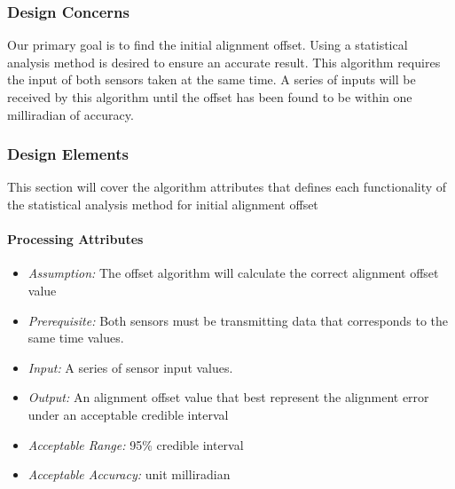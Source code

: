 		\subsubsection{Design Concerns}
		Our primary goal is to find the initial alignment offset. Using a statistical analysis method is desired to ensure an accurate result. This algorithm requires the input of both sensors taken at the same time. A series of inputs will be received by this algorithm until the offset has been found to be within one milliradian of accuracy.\\

		\subsubsection{Design Elements}
		This section will cover the algorithm attributes that defines each functionality of the statistical analysis method for initial alignment offset

			\paragraph{Processing Attributes}
			\begin{itemize}
				\item \textit{Assumption:} The offset algorithm will calculate the correct alignment offset  value 
				\item \textit{Prerequisite:} Both sensors must be transmitting data that corresponds to the same time values.
				\item \textit{Input:} A series of sensor input values.
				\item \textit{Output:} An alignment offset value that best represent the alignment error under an acceptable credible interval 
				\item \textit{Acceptable Range:} 95\% credible interval 
				\item \textit{Acceptable Accuracy:} unit milliradian\\
			\end{itemize}

